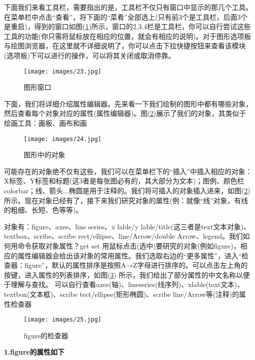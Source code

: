         下面我们来看工具栏，需要指出的是，工具栏不仅只有窗口中显示的那几个工具。在菜单栏中点击“查看”，将下面的“菜肴”全部选上(只有前3个是工具栏，后面3个是重启)，得到的窗口如图(\ref{图形窗口})所示，窗口的2,3,4栏是工具栏，你可以自行尝试这些工具的功能(你只需将鼠标放在相应的位置，就会有相应的说明)。对于图形选项板与绘图浏览器，在这里就不详细说明了，你可以点击下拉快捷按钮来查看该模块(选项板)下可以进行的操作，可以将其关闭或取消停靠。
        \begin{figure}[H]
        \centering
        \texttt{[image: images/23.jpg]}
        \caption{图形窗口}
        \label{图形窗口}
        \end{figure}
        下面，我们将详细介绍属性编辑器。先来看一下我们绘制的图形中都有哪些对象，然后查看每个对象对应的属性(属性编辑器)。图(\ref{图形中的对象})展示了我们的对象，其类似于绘画工具：画板、画布和画
        \begin{figure}[H]
        \centering
        \texttt{[image: images/24.jpg]}
        \caption{图形中的对象}
        \label{图形中的对象}
        \end{figure}
        \par
        可能存在的对象绝不仅有这些，我们可以在菜单栏下的“插入”中插入相应的对象：X标签、Y标签和标题(这3者是每张图必有的，其大部分为文本)；图例、颜色栏colorbar；线、箭头$\dots$椭圆是用于注释的。我们将可插入的对象插入进来，如图(\ref{图形中的对象})所示。现在对象已经有了，接下来我们研究对象的属性(例：就像“线”对象，有线的粗细、长短、色等等)。
        \par
        对象有：figure、axes、line series、x lable/y lable/title(这三者是text文本对象)、textbox、scribe、scribe rect/ellipse、line/Arrow/double Arrow、legend。我们如何用命令获取对象属性？get set 用鼠标点击(选中)要研究的对象(例如figure)，相应的属性编辑器会给出该对象的常用属性。我们选取右边的“更多属性”，进入“检查器：figure”，默认的属性排序是按照A→Z字母进行排序的。可以点击左上角的按键，进入属性的列表排序，如图(\ref{fig:figure的检查器}) 所示，我们给出了部分属性的中文名称以便于理解与查找。
        可以自行查看axes(轴)、lineseries(线序列)、xlable(text文本)、textbox(文本框)、scribe tect/ellipse(矩形椭圆)、scribe line/Arrow等(注释)的属性检查器
        \begin{figure}[H]
        \centering
        \texttt{[image: images/25.jpg]}
        \caption{figure的检查器}
        \label{fig:figure的检查器}
        \end{figure}
        \textbf{1.figure的属性如下}
